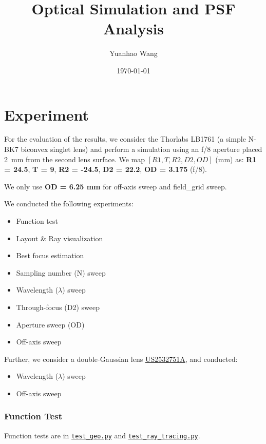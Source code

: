 \documentclass[11pt,a4paper]{article}
\title{Optical Simulation and PSF Analysis}
\author{Yuanhao Wang}
\date{\today}
\begin{document}
	\maketitle
	
	\section{Experiment}\label{experiment}
	
	For the evaluation of the results, we consider the Thorlabs LB1761 (a simple N-BK7 biconvex singlet lens) and perform a simulation using an f/8 aperture placed \SI{2}{\milli\meter} from the second lens surface.
	We map \([R1, T, R2, D2, OD]\) (mm) as:
	\textbf{R1 = 24.5}, \textbf{T = 9}, \textbf{R2 = -24.5}, \textbf{D2 = 22.2}, \textbf{OD = 3.175} (f/8).
	
	We only use \textbf{OD = 6.25 mm} for off-axis sweep and field\_grid sweep.
	
	We conducted the following experiments:
	\begin{itemize}
		\item Function test
		\item Layout \& Ray visualization
		\item Best focus estimation
		\item Sampling number (N) sweep
		\item Wavelength (\(\lambda\)) sweep
		\item Through-focus (D2) sweep
		\item Aperture sweep (OD)
		\item Off-axis sweep
	\end{itemize}
	
	Further, we consider a double-Gaussian lens \href{https://patents.google.com/patent/US2532751}{US2532751A}, and conducted:
	\begin{itemize}
		\item Wavelength (\(\lambda\)) sweep
		\item Off-axis sweep
	\end{itemize}
	
	\subsubsection*{Function Test}\label{function-test}
	
	Function tests are in \href{../tests/test_geo.py}{\texttt{test\_geo.py}} and \href{../tests/test_ray_tracing.py}{\texttt{test\_ray\_tracing.py}}.
	
\end{document}
